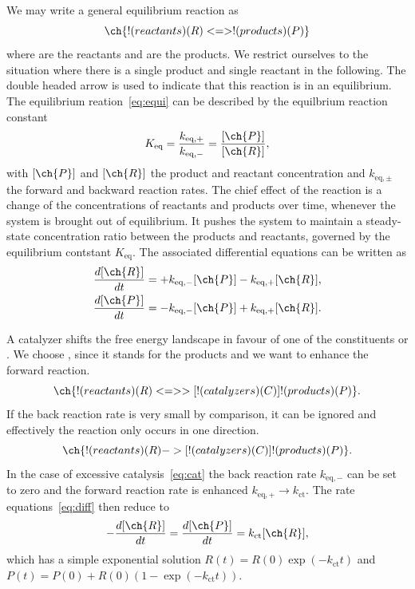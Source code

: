 \documentclass[aip,jcp,reprint,a4paper,onecolumn,nofootinbib,amsmath,amssymb]{revtex4-1}
\begin{document}
We may write a general equilibrium reaction as
\begin{equation}
  \label{eq:equi}
  \ch{!(reactants)(R) <=> !(products)(P)}
\end{equation}
where  are the reactants and  are the products. We restrict ourselves to the situation where there is a single product and single reactant in the following. The double headed arrow is used to indicate that this reaction is in an equilibrium. The equilibrium reation~\eqref{eq:equi} can be described by the equilbrium reaction constant
\begin{equation}
  \label{eq:const}
  K_{\text{eq}} = \frac{k_{\text{eq},+}}{k_{\text{eq},-}} = \frac{[\ch{P}]}{[\ch{R}]} ,
\end{equation}
with $[\ch{P}]$ and $[\ch{R}]$ the product and reactant concentration and $k_{\textrm{eq},\pm}$ the forward and backward reaction rates. The chief effect of the reaction is a change of the concentrations of reactants and products over time, whenever the system is brought out of equilibrium. It pushes the system to maintain a steady-state concentration ratio between the products and reactants, governed by the equilibrium contstant $K_{\text{eq}}$. The associated differential equations can be written as
\begin{subequations}
  \label{eq:diff}
  \begin{align}
    \label{eq:diff-equi-a}
    \frac{d[\ch{R}]}{dt} &= + k_{\text{eq},-}[\ch{P}] - k_{\text{eq},+}[\ch{R}] , \\
    \label{eq:diff-equi-b}
    \frac{d[\ch{P}]}{dt} &= - k_{\text{eq},-}[\ch{P}] + k_{\text{eq},+}[\ch{R}] .
  \end{align}
\end{subequations}

A catalyzer shifts the free energy landscape in favour of one of the constituents  or . We choose , since it stands for the products and we want to enhance the forward reaction.
\begin{equation}
  \ch{!(reactants)(R) <=>>[ !(catalyzers)(C) ] !(products)(P)} .
\end{equation}
If the back reaction rate is very small by comparison, it can be ignored and effectively the reaction only occurs in one direction.
\begin{equation}
  \label{eq:cat}
  \ch{!(reactants)(R) ->[ !(catalyzers)(C) ] !(products)(P)} .
\end{equation}
In the case of excessive catalysis~\eqref{eq:cat} the back reaction rate $k_{\text{eq},-}$ can be set to zero and the forward reaction rate is enhanced $k_{\text{eq},+} \to k_{\text{ct}}$. The rate equations~\eqref{eq:diff} then reduce to
\begin{equation}
  \label{eq:diff-cat}
  -\frac{d[\ch{R}]}{dt} = \frac{d[\ch{P}]}{dt} = k_{\text{ct}}[\ch{R}] ,
\end{equation}
which has a simple exponential solution $R(t) = R(0)\exp(- k_{\text{ct}} t)$ and $P(t) = P(0) + R(0)(1 - \exp(- k_{\text{ct}} t))$.
\end{document}
